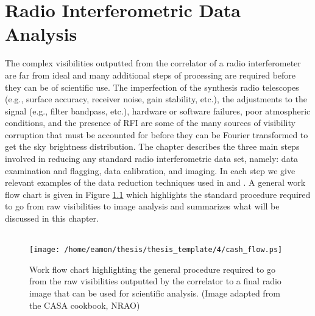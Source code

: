 
\chapter{Radio Interferometric Data Analysis} \label{chap:4}

The complex visibilities outputted from the correlator of a radio interferometer are far from ideal and many additional steps of processing are required before they can be of scientific use. The imperfection of the synthesis radio telescopes (e.g., surface accuracy, receiver noise, gain stability, etc.), the adjustments to the signal (e.g., filter bandpass, etc.), hardware or software failures, poor atmospheric conditions, and the presence of RFI are some of the many sources of visibility corruption that must be accounted for before they can be Fourier transformed to get the sky brightness distribution. The chapter describes the three main steps involved in reducing any standard radio interferometric data set, namely: data examination and flagging, data calibration, and imaging. In each step we give relevant examples of the data reduction techniques used in \cite{ogorman_2012} and \cite{ogorman_2013}. A general work flow chart is given in Figure \ref{fig:4.1} which highlights the standard procedure required to go from raw visibilities to image analysis and summarizes what will be discussed in this chapter.\\
\\
\begin{figure}[hbt!]
\centering 
          \texttt{[image: /home/eamon/thesis/thesis\_template/4/cash\_flow.ps]}
\caption[Radio interferometry work flow chart.]{Work flow chart highlighting the general procedure required to go from the raw visibilities outputted by the correlator to a final radio image that can be used for scientific analysis. (Image adapted from the CASA cookbook, NRAO)}
\label{fig:4.1}
\end{figure}

